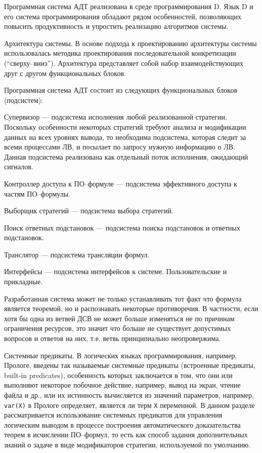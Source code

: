 \documentclass[a4paper]{report}
\begin{document}
Программная система АДТ реализована в среде программирования D. Язык D и его система программирования обладают рядом особенностей, позволяющих повысить продуктивность и упростить реализацию алгоритмов системы.

Архитектура системы. В основе подхода к проектированию архитектуры системы использовалась методика проектирования последовательной конкретизации (``сверху--вниз''). Архитектура представляет собой набор взаимодействующих друг с другом функциональных блоков.

Программная система АДТ состоит из следующих функциональных блоков (подсистем):
\begin{description}
  \item{Супервизор} --- подсистема исполнения любой реализованной стратегии. Поскольку особенности некоторых стратегий требуют анализа и модификации данных на всех уровнях вывода, то необходима подсистема, которая следит за всеми процессами ЛВ, и посылает по запросу нужную информацию о ЛВ. Данная подсистема реализована как отдельный поток исполнения, ожидающий сигналов.
  \item{Контроллер доступа к ПО--формуле} --- подсистема эффективного доступа к частям ПО--формулы.
  \item{Выборщик стратегий} --- подсистема выбора стратегий.
  \item{Поиск ответных подстановок} --- подсистема поиска подстановок и ответных подстановок.
  \item{Транслятор} --- подсистема трансляции формул.
  \item{Интерфейсы} --- подсистема интерфейсов к системе. Пользовательские и прикладные.
\end{description}

Разработанная система может не только устанавливать тот факт что формула является теоремой, но и распознавать некоторые противоречия. В частности, если хотя бы одна из ветвей ДСВ не может больше изменяться не по причинам ограничения ресурсов, это значит что больше не существует допустимых вопросов и ответов на них, т.е. ветвь принципиально неопровержима.

Системные предикаты. В логических языках программирования, например, Прологе, введены так называемые системные предикаты (встроенные предикаты, built-in predicates), особенность которых заключается в том, что они или выполняют некоторое побочное действие, например, вывод на экран, чтение файла и др., или их истинность вычисляется из значений параметров, например, \texttt{var(X)} в Прологе определяет, является ли терм \texttt{X} переменной. В данном разделе рассматривается использование системных предикатов для управления логическим выводом в процессе построения автоматического доказательства теорем в исчислении ПО--формул, то есть как способ задания дополнительных знаний о задаче в виде модификаторов стратегии, используемой по умолчанию.
\end{document}

